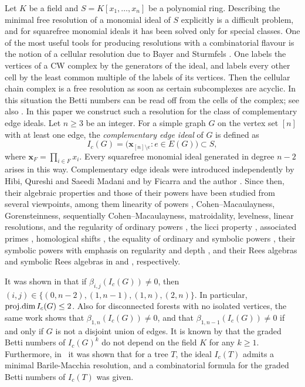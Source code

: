 \documentclass[12pt]{amsart}
\def\pd{\textup{proj.dim}}
\begin{document}
    Let $K$ be a field and $S=K[x_1,\ldots,x_n]$ be a polynomial ring. Describing the minimal free resolution of a monomial ideal of $S$ explicitly is a difficult problem, and for squarefree monomial ideals it has been solved only for special classes. One of the most useful tools for producing resolutions with a combinatorial flavour is the notion of a cellular resolution due to Bayer and Sturmfels \cite{bs1998}. One labels the vertices of a CW complex by the generators of the ideal, and labels every other cell by the least common multiple of the labels of its vertices. Then the cellular chain complex is a free resolution as soon as certain subcomplexes are acyclic. In this situation the Betti numbers can be read off from the cells of the complex; see also \cite{ms2005}.
In this paper we construct such a resolution for the class of complementary edge ideals. Let $n\geq 3$ be an integer. For a simple graph $G$ on the vertex set $[n]$ with at least one edge, the \emph{complementary edge ideal} of $G$ is defined as
\[
I_c(G)=\big(\mathbf x_{[n]\setminus e} : e\in E(G)\big)\subset S,
\]
where $\mathbf x_F=\prod_{i\in F}x_i$. Every squarefree monomial ideal generated in degree $n-2$ arises in this way. 
 Complementary edge ideals were introduced independently by Hibi, Qureshi and Saeedi Madani \cite{hqm2026} and by Ficarra and the author \cite{fm2025}. Since then, their algebraic properties and those of their powers have been studied from several viewpoints, among them linearity of powers \cite{fmStanley-Reisner2025},
 Cohen–Macaulayness, Gorensteinness, sequentially Cohen–Macaulayness, matroidality, levelness, linear resolutions, and the regularity of ordinary powers \cite{fm2025,hqm2026},  
 the licci property \cite{bcj2026,l2026}, associated primes \cite{f2026}, homological shifts \cite{lwz}, the equality of ordinary and symbolic powers \cite{rs2025}, their symbolic powers  with emphasis on regularity and depth  \cite{fmmReg2026,HK}, and their Rees algebras and symbolic Rees algebras  in \cite{fmRees2025} and \cite{fmm2026}, respectively.
 \smallskip

It was shown in \cite{hqm2026} that if $\beta_{i,j}(I_c(G))\neq0$, then $(i,j)\in\{(0,n-2),(1,n-1),(1,n),(2,n)\}$. In particular, $\pd\, I_c(G)\le 2$. Also for disconnected forests with no isolated vertices, the same work shows  that $\beta_{1,n}(I_c(G))\neq0$, and that $\beta_{1,n-1}(I_c(G))\neq0$ if and only if $G$ is not a disjoint union of edges. It is known by \cite[Corollary~4.7]{fm2025} that the graded Betti numbers of $I_c(G)^k$ do not depend on the field $K$ for any $k\ge1$.   Furthermore, in~\cite{jrs2026} it was shown that 
for a tree $T$, the ideal $I_c(T)$  admits a minimal Barile-Macchia resolution, and a combinatorial formula for the graded Betti numbers of $I_c(T)$ was given. 
\end{document}
